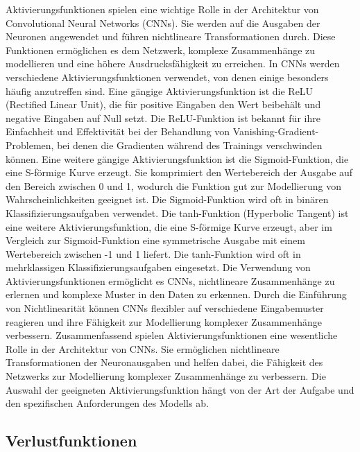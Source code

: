     Aktivierungsfunktionen spielen eine wichtige Rolle in der Architektur von Convolutional Neural Networks (CNNs). 
    Sie werden auf die Ausgaben der Neuronen angewendet und führen nichtlineare Transformationen durch. 
    Diese Funktionen ermöglichen es dem Netzwerk, komplexe Zusammenhänge zu modellieren und eine höhere Ausdrucksfähigkeit zu erreichen.    
    In CNNs werden verschiedene Aktivierungsfunktionen verwendet, von denen einige besonders häufig anzutreffen sind. 
    Eine gängige Aktivierungsfunktion ist die ReLU (Rectified Linear Unit), die für positive Eingaben den Wert beibehält und negative Eingaben auf Null setzt. 
    Die ReLU-Funktion ist bekannt für ihre Einfachheit und Effektivität bei der Behandlung von Vanishing-Gradient-Problemen, bei denen die Gradienten während des Trainings verschwinden können.
    Eine weitere gängige Aktivierungsfunktion ist die Sigmoid-Funktion, die eine S-förmige Kurve erzeugt. 
    Sie komprimiert den Wertebereich der Ausgabe auf den Bereich zwischen 0 und 1, wodurch die Funktion gut zur Modellierung von Wahrscheinlichkeiten geeignet ist. 
    Die Sigmoid-Funktion wird oft in binären Klassifizierungsaufgaben verwendet.    
    Die tanh-Funktion (Hyperbolic Tangent) ist eine weitere Aktivierungsfunktion, die eine S-förmige Kurve erzeugt, aber im Vergleich zur Sigmoid-Funktion eine symmetrische Ausgabe mit einem Wertebereich zwischen -1 und 1 liefert. 
    Die tanh-Funktion wird oft in mehrklassigen Klassifizierungsaufgaben eingesetzt.    
    Die Verwendung von Aktivierungsfunktionen ermöglicht es CNNs, nichtlineare Zusammenhänge zu erlernen und komplexe Muster in den Daten zu erkennen. 
    Durch die Einführung von Nichtlinearität können CNNs flexibler auf verschiedene Eingabemuster reagieren und ihre Fähigkeit zur Modellierung komplexer Zusammenhänge verbessern.    
    Zusammenfassend spielen Aktivierungsfunktionen eine wesentliche Rolle in der Architektur von CNNs. 
    Sie ermöglichen nichtlineare Transformationen der Neuronausgaben und helfen dabei, die Fähigkeit des Netzwerks zur Modellierung komplexer Zusammenhänge zu verbessern. 
    Die Auswahl der geeigneten Aktivierungsfunktion hängt von der Art der Aufgabe und den spezifischen Anforderungen des Modells ab.

\subsection{Verlustfunktionen}

